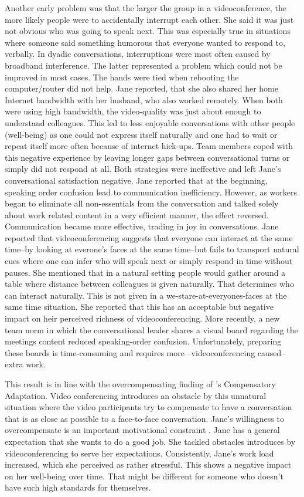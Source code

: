 \documentclass[man]{apa7}
\begin{document}
Another early problem was that the larger the group in a videoconference, the more likely people were to accidentally interrupt each other. She said it was just not obvious who was going to speak next. This was especially true in situations where someone said something humorous that everyone wanted to respond to, verbally. In dyadic conversations, interruptions were most often caused by broadband interference. The latter represented a problem which could not be improved in most cases. The hands were tied when rebooting the computer/router did not help. Jane reported, that she also shared her home Internet bandwidth with her husband, who also worked remotely. When both were using high bandwidth, the video-quality was just about enough to understand colleagues. This led to less enjoyable conversations with other people (well-being) as one could not express itself naturally and one had to wait or repeat itself more often because of internet hick-ups. Team members coped with this negative experience by leaving longer gaps between conversational turns or simply did not respond at all. Both strategies were ineffective and left Jane's conversational satisfaction negative. Jane reported that at the beginning, speaking order confusion lead to communication inefficiency. However, as workers began to eliminate all non-essentials from the conversation and talked solely about work related content in a very efficient manner, the effect reversed. Communication became more effective, trading in joy in conversations. Jane reported that videoconferencing suggests that everyone can interact at the same time–by looking at everone's faces at the same time–but fails to transport natural cues where one can infer who will speak next or simply respond in time without pauses. She mentioned that in a natural setting people would gather around a table where distance between colleagues is given naturally. That determines who can interact naturally. This is not given in a we-stare-at-everyones-faces at the same time situation. She reported that this has an acceptable but negative impact on heir perceived richness of videoconferencing. More recently, a new team norm in which the conversational leader shares a visual board regarding the meetings content reduced speaking-order confusion. Unfortunately, preparing these boards is time-consuming and requires more –videoconferencing caused– extra work.

This result is in line with the overcompensating finding of \citeauthor{Kock2005}'s Compensatory Adaptation. Video conferencing introduces an obstacle by this unnatural situation where the video participants try to compensate to have a conversation that is as close as possible to a face-to-face conversation. Jane's willingness to overcompensate is an important motivational constraint \parencite{Kock2001}. Jane has a general expectation that she wants to do a good job. She tackled obstacles introduces by videoconferencing to serve her expectations. Consistently, Jane's work load increased, which she perceived as rather stressful. This shows a negative impact on her well-being over time. That might be different for someone who doesn't have such high standards for themselves.
\end{document}
